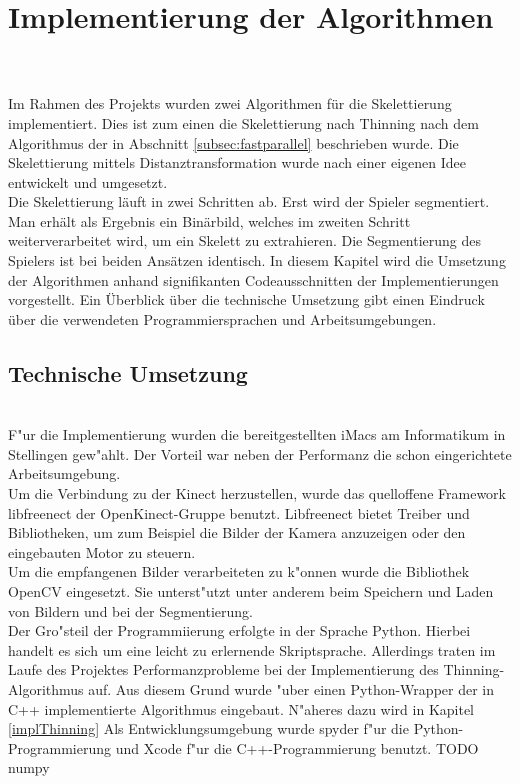 \chapter{Implementierung der Algorithmen}
\\\\
Im Rahmen des Projekts wurden zwei Algorithmen für die Skelettierung implementiert. Dies ist zum einen
die Skelettierung nach Thinning nach dem Algorithmus der in Abschnitt \ref{subsec:fastparallel} beschrieben wurde. Die Skelettierung mittels Distanztransformation wurde nach einer eigenen Idee entwickelt und
umgesetzt.\\
Die Skelettierung läuft in zwei Schritten ab. Erst wird der Spieler segmentiert. Man erhält als
Ergebnis ein Binärbild, welches im zweiten Schritt weiterverarbeitet wird, um ein Skelett zu extrahieren. 
Die Segmentierung des Spielers ist bei beiden Ansätzen identisch.
In diesem Kapitel wird die Umsetzung der Algorithmen anhand signifikanten Codeausschnitten der Implementierungen vorgestellt. Ein Überblick über die technische Umsetzung gibt einen Eindruck über die
verwendeten Programmiersprachen und Arbeitsumgebungen.
\section{Technische Umsetzung}
\\
F"ur die Implementierung wurden die bereitgestellten iMacs am Informatikum in Stellingen gew"ahlt. Der Vorteil war neben der Performanz die schon eingerichtete Arbeitsumgebung.\\
Um die Verbindung zu der Kinect herzustellen, wurde das quelloffene Framework libfreenect  der OpenKinect-Gruppe benutzt. Libfreenect bietet Treiber und Bibliotheken, um zum Beispiel die Bilder der Kamera anzuzeigen oder den eingebauten Motor zu steuern. \\
Um die empfangenen Bilder verarbeiteten zu k"onnen wurde die Bibliothek OpenCV eingesetzt. Sie unterst"utzt unter anderem beim Speichern und Laden von Bildern und bei der Segmentierung. \\
Der Gro"steil der Programmiierung erfolgte in der Sprache Python. Hierbei handelt es sich um eine leicht zu erlernende Skriptsprache. Allerdings traten im Laufe des Projektes Performanzprobleme bei der Implementierung des Thinning-Algorithmus auf. Aus diesem Grund wurde "uber einen Python-Wrapper der in C++ implementierte Algorithmus eingebaut. N"aheres dazu wird in Kapitel \ref{implThinning}
Als Entwicklungsumgebung wurde spyder f"ur die Python-Programmierung und Xcode f"ur die C++-Programmierung benutzt.
TODO numpy
